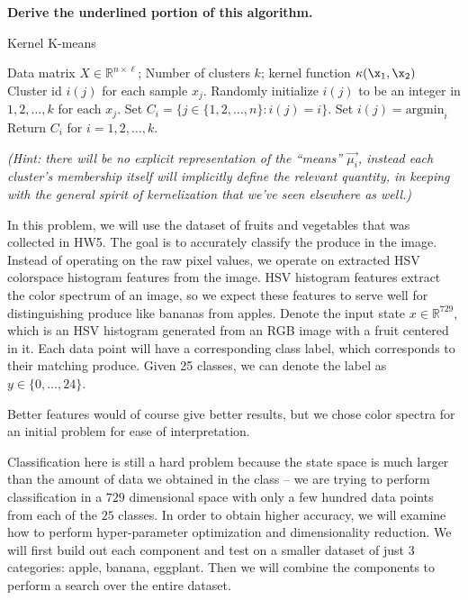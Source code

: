 \documentclass[preview]{standalone}
\begin{document}
\begin{Parts}
\textbf{Derive the underlined portion of this algorithm.}  

\begin{algorithm}[H]
\caption{Kernel K-means}
\label{alg:kmeans}
\begin{algorithmic}
   \Require Data matrix $X\in \mathbb R^{n\times \ell}$; Number of clusters $k$; kernel function $\kappa(\x_1,\x_2)$
   \Ensure Cluster id $i(j)$ for each sample $x_j$.
      \State Randomly initialize $i(j)$ to be an integer in $1,2,\ldots,k$ for each $x_j$.
          \State Set $C_i=\{j\in\{1,2,\ldots,n\}:i(j)=i\}$.
        \EndFor
          \State Set $i(j) =\text{argmin}_{i}$ \underline{\bf \qquad\qquad\qquad\qquad\qquad\qquad\qquad\qquad}
        \EndFor
      \EndWhile
      \State Return $C_i$ for $i = 1, 2, \ldots, k$.
  \EndFunction
\end{algorithmic}
\end{algorithm}


{\em (Hint: there will be no explicit representation of the ``means''
  $\vec{\mu_i}$, instead each cluster's membership itself will implicitly
  define the relevant quantity, in keeping with the general spirit of
  kernelization that we've seen elsewhere as well.)}



\end{Parts}

In this problem, we will use the dataset of fruits and vegetables that
was collected in HW5. The goal is to accurately classify the
produce in the image. Instead of operating on the raw pixel values, we
operate on extracted HSV colorspace histogram features from the image. HSV
histogram features extract the color spectrum of an image, so we
expect these features to serve well for distinguishing produce like
bananas from apples. Denote the input state $x \in \mathbb{R}^{729}$,
which is an HSV histogram generated from an RGB image with a fruit
centered in it. Each data point will have a corresponding class label,
which corresponds to their matching produce. Given 25 classes, we can
denote the label as $y \in \lbrace 0,...,24 \rbrace$. 

Better features would of course give better results, but we chose
color spectra for an initial problem for ease of interpretation.


Classification here is still a hard problem because the state space is
much larger than the amount of data we obtained in the class -- we are
trying to perform classification in a $729$ dimensional space with only a few hundred data points from each of the $25$ classes. In order to obtain higher accuracy, we will examine how to perform hyper-parameter optimization and dimensionality reduction. We will first build out each component and test on a smaller dataset of just 3 categories: apple, banana, eggplant. Then we will combine the components to perform a search over the entire dataset.
\end{document}
